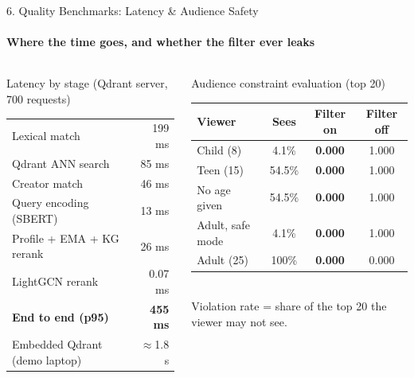 \documentclass[aspectratio=169, 11pt]{beamer}
\begin{document}
\begin{frame}{6. Quality Benchmarks: Latency \& Audience Safety}
    \framesubtitle{Where the time goes, and whether the filter ever leaks}
    \begin{columns}[T]
        \begin{block}{Latency by stage (Qdrant server, 700 requests)}
            \scriptsize
            \renewcommand{\arraystretch}{1.12}
            \begin{tabular}{l r}
                \toprule
                Lexical match & 199 ms \\
                Qdrant ANN search & 85 ms \\
                Creator match & 46 ms \\
                Query encoding (SBERT) & 13 ms \\
                Profile + EMA + KG rerank & 26 ms \\
                LightGCN rerank & 0.07 ms \\
                \midrule
                \textbf{End to end (p95)} & \textbf{455 ms} \\
                Embedded Qdrant (demo laptop) & $\approx$1.8 s \\
                \bottomrule
            \end{tabular}
        \end{block}
        \begin{block}{Audience constraint evaluation (top 20)}
            \scriptsize
            \renewcommand{\arraystretch}{1.12}
            \begin{tabular}{l c c c}
                \toprule
                \textbf{Viewer} & \textbf{Sees} & \textbf{Filter on} & \textbf{Filter off} \\
                \midrule
                Child (8) & 4.1\% & \textbf{0.000} & 1.000 \\
                Teen (15) & 54.5\% & \textbf{0.000} & 1.000 \\
                No age given & 54.5\% & \textbf{0.000} & 1.000 \\
                Adult, safe mode & 4.1\% & \textbf{0.000} & 1.000 \\
                Adult (25) & 100\% & \textbf{0.000} & 0.000 \\
                \bottomrule
            \end{tabular}\\[2pt]
            {\tiny Violation rate = share of the top 20 the viewer may not see.}
        \end{block}
    \end{columns}
\end{frame}
\end{document}
